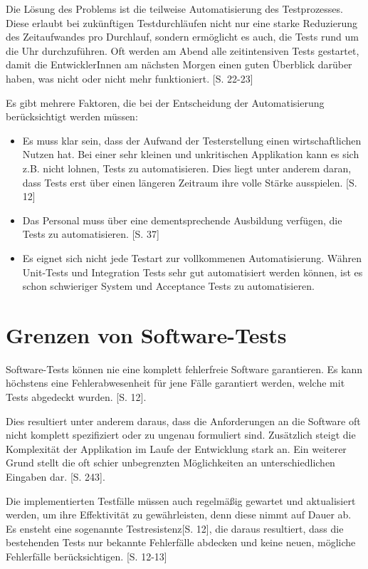 \documentclass[a4paper,bibtotoc,oneside]{scrbook}
\begin{document}
Die Lösung des Problems ist die teilweise Automatisierung des Testprozesses. Diese erlaubt bei zukünftigen Testdurchläufen nicht nur eine starke Reduzierung des Zeitaufwandes pro Durchlauf, sondern ermöglicht es auch, die Tests rund um die Uhr durchzuführen. Oft werden am Abend alle zeitintensiven Tests gestartet, damit die EntwicklerInnen am nächsten Morgen einen guten Überblick darüber haben, was nicht oder nicht mehr funktioniert. \cite{test_auto}[S. 22-23]

Es gibt mehrere Faktoren, die bei der Entscheidung der Automatisierung berücksichtigt werden müssen: 

\begin{itemize}
  \item Es muss klar sein, dass der Aufwand der Testerstellung einen wirtschaftlichen Nutzen hat. Bei einer sehr kleinen und unkritischen Applikation kann es sich z.B. nicht lohnen, Tests zu automatisieren. Dies liegt unter anderem daran, dass Tests erst über einen längeren Zeitraum ihre volle Stärke ausspielen. \cite{eval_regression}[S. 12]
  \item Das Personal muss über eine dementsprechende Ausbildung verfügen, die Tests zu automatisieren. \cite{eval_automat_webapp_test}[S. 37]
  \item Es eignet sich nicht jede Testart zur vollkommenen Automatisierung. Währen Unit-Tests und Integration Tests sehr gut automatisiert werden können, ist es schon schwieriger System und Acceptance Tests zu automatisieren. 
\end{itemize}


\section{Grenzen von Software-Tests}
Software-Tests können nie eine komplett fehlerfreie Software garantieren. Es kann höchstens eine Fehlerabwesenheit für jene Fälle garantiert werden, welche mit Tests abgedeckt wurden. \cite{eval_regression}[S. 12]. 

Dies resultiert unter anderem daraus, dass die Anforderungen an die Software oft nicht komplett spezifiziert oder zu ungenau formuliert sind. Zusätzlich steigt die Komplexität der Applikation im Laufe der Entwicklung stark an. Ein weiterer Grund stellt die oft schier unbegrenzten Möglichkeiten an unterschiedlichen Eingaben dar. \cite{software_qual}[S. 243].

Die implementierten Testfälle müssen auch regelmäßig gewartet und aktualisiert werden, um ihre Effektivität zu gewährleisten, denn diese nimmt auf Dauer ab. Es ensteht eine sogenannte \glqq Testresistenz\grqq\cite{eval_regression}[S. 12], die daraus resultiert, dass die bestehenden Tests nur bekannte Fehlerfälle abdecken und keine neuen, mögliche Fehlerfälle berücksichtigen. \cite{eval_regression}[S. 12-13]
\end{document}
